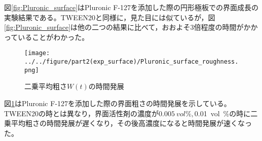\documentclass[autodetect-engine,dvi=dvipdfmx,a4paper,ja=standard,oneside,openany,11pt]{bxjsbook}
\begin{document}
図\ref{fig:Pluronic_surface}はPluronic F-127を添加した際の円形極板での界面成長の実験結果である。TWEEN20と同様に，見た目には似ているが，図\ref{fig:Pluronic_surface}は他の二つの結果に比べて，おおよそ3倍程度の時間がかかっていることがわかった。

\begin{figure}[htbp]
  \centering
  \texttt{[image: ../../figure/part2(exp\_surface)/Pluronic\_surface\_roughness.png]}
  \caption{二乗平均粗さ$W(t)$の時間発展}
  \label{fig:surface_roughness_Pluronic}
\end{figure}

図\ref{fig:surface_roughness_Pluronic}はPluronic F-127を添加した際の界面粗さの時間発展を示している。TWEEN20の時とは異なり，界面活性剤の濃度が$\SI{0.005}{vol\%}, $\SI{0.01}{vol\%}の時に二乗平均粗さの時間発展が遅くなり，その後高濃度になると時間発展が速くなった。

\ifdraft{
  
  
}{}
\end{document}
